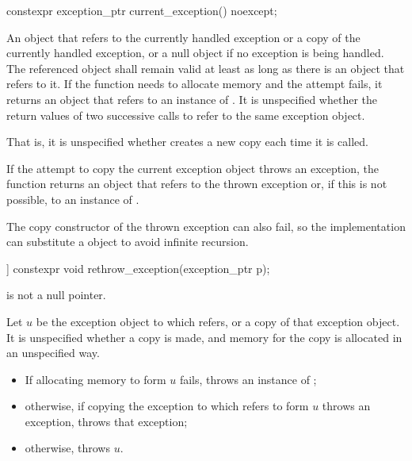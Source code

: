 %
\begin{itemdecl}
constexpr exception_ptr current_exception() noexcept;
\end{itemdecl}

\begin{itemdescr}
\pnum
\returns
An  object that refers to
the currently handled exception or a copy of the currently
handled exception, or a null  object if no exception is being
handled. The referenced object shall remain valid at least as long as there is an
 object that refers to it.
If the function needs to allocate memory and the attempt fails, it returns an
 object that refers to an instance of .
It is unspecified whether the return values of two successive calls to
 refer to the same exception object.
\begin{note}
That is, it is unspecified whether 
creates a new copy each time it is called.
\end{note}
If the attempt to copy the current exception object throws an exception, the function
returns an  object that refers to the thrown exception or,
if this is not possible, to an instance of .
\begin{note}
The copy constructor of the thrown exception can also fail,
so the implementation can substitute a  object
to avoid infinite recursion.
\end{note}
\end{itemdescr}

%
\begin{itemdecl}
[[noreturn]] constexpr void rethrow_exception(exception_ptr p);
\end{itemdecl}

\begin{itemdescr}
\pnum
\expects
{} is not a null pointer.

\pnum
\effects
Let $u$ be the exception object to which  refers, or
a copy of that exception object.
It is unspecified whether a copy is made, and
memory for the copy is allocated in an unspecified way.
\begin{itemize}
\item
If allocating memory to form $u$ fails,
throws an instance of ;
\item
otherwise, if copying the exception to which  refers
to form $u$ throws an exception, throws that exception;
\item
otherwise, throws $u$.
\end{itemize}
\end{itemdescr}

